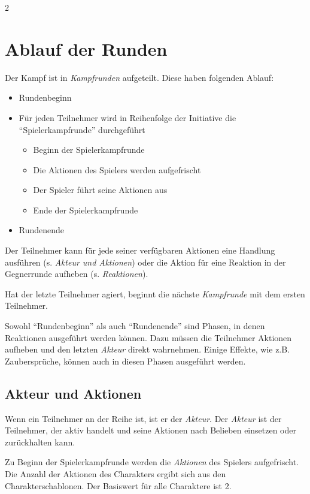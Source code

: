 \begin{multicols}{2}
\section{Ablauf der Runden}

Der Kampf ist in \textit{Kampfrunden} aufgeteilt. Diese haben folgenden Ablauf:
\begin{itemize}
    \item Rundenbeginn
    \item Für jeden Teilnehmer wird in Reihenfolge der Initiative die ``Spielerkampfrunde'' durchgeführt
    \begin{itemize}
        \item Beginn der Spielerkampfrunde
        \item Die Aktionen des Spielers werden aufgefrischt
        \item Der Spieler führt seine Aktionen aus
        \item Ende der Spielerkampfrunde
    \end{itemize}
    \item Rundenende
\end{itemize}

Der Teilnehmer kann für jede seiner verfügbaren Aktionen eine Handlung ausführen (s. \textit{Akteur und Aktionen}) oder die Aktion für eine Reaktion in der Gegnerrunde aufheben (s. \textit{Reaktionen}).

Hat der letzte Teilnehmer agiert, beginnt die nächste \textit{Kampfrunde} mit dem ersten Teilnehmer.

Sowohl ``Rundenbeginn'' als auch ``Rundenende'' sind Phasen, in denen Reaktionen ausgeführt werden können. Dazu müssen die Teilnehmer Aktionen aufheben und den letzten \textit{Akteur} direkt wahrnehmen. Einige Effekte, wie z.B. Zaubersprüche, können auch in diesen Phasen ausgeführt werden.

\subsection{Akteur und Aktionen}

Wenn ein Teilnehmer an der Reihe ist, ist er der \textit{Akteur}. Der \textit{Akteur} ist der Teilnehmer, der aktiv handelt und seine Aktionen nach Belieben einsetzen oder zurückhalten kann.

Zu Beginn der Spielerkampfrunde werden die \textit{Aktionen} des Spielers aufgefrischt. Die Anzahl der Aktionen des Charakters ergibt sich aus den Charakterschablonen. Der Basiswert für alle Charaktere ist 2.


\end{multicols}
